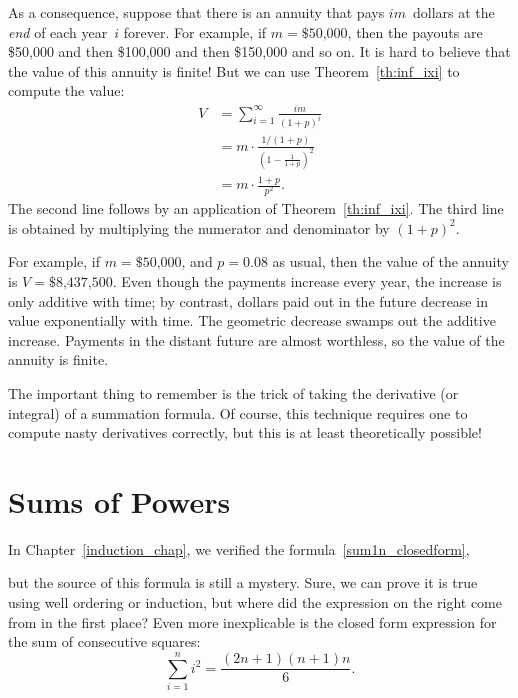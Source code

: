 As a consequence, suppose that there is an annuity that pays
$im$~dollars at the \emph{end} of each year~$i$ forever.  For example,
if $m = \text{\$50,000}$, then the payouts are \$50,000 and then
\$100,000 and then \$150,000 and so on.  It is hard to believe
that the value of this annuity is finite!  But we can use
Theorem~\ref{th:inf_ixi} to compute the value:
\begin{align*}
V & = \sum_{i=1}^\infty \frac{im}{(1+p)^i} \\
  & = m \cdot \frac{1/(1+p)}{(1 - \frac{1}{1+p})^2} \\
  & = m \cdot \frac{1+p}{p^2}.
\end{align*}
The second line follows by an application of Theorem~\ref{th:inf_ixi}.
The third line is obtained by multiplying the numerator and
denominator by $(1+p)^2$.

For example, if $m = \text{\$50,000}$, and $p = 0.08$ as usual, then
the value of the annuity is $V = \text{\$8,437,500}$.  Even though the
payments increase every year, the increase is only additive with time;
by contrast, dollars paid out in the future decrease in value
exponentially with time.  The geometric decrease swamps out the
additive increase.  Payments in the distant future are almost
worthless, so the value of the annuity is finite.

The important thing to remember is the trick of taking the derivative
(or integral) of a summation formula.  Of course, this technique
requires one to compute nasty derivatives correctly, but this is at
least theoretically possible!

\begin{problems}
\classproblems
{}

\homeworkproblems
{}

\end{problems}

\section{Sums of Powers}

In Chapter~\ref{induction_chap}, we verified the formula~\eqref{sum1n_closedform},
\iffalse
\begin{equation}\label{eqn:G26}
    \sum_{i = 1}^n i = \frac{n (n + 1)}{2}.
\end{equation}\fi
but the source of this formula is still a mystery.  Sure, we can prove
it is true using well ordering or induction, but where did the
expression on the right come from in the first place?  Even more
inexplicable is the closed form expression for the sum of consecutive
squares:
\begin{equation}\label{eqn:G27}
    \sum_{i = 1}^n i^2 = \frac{(2n+1) (n+1) n}{6}.
\end{equation}


